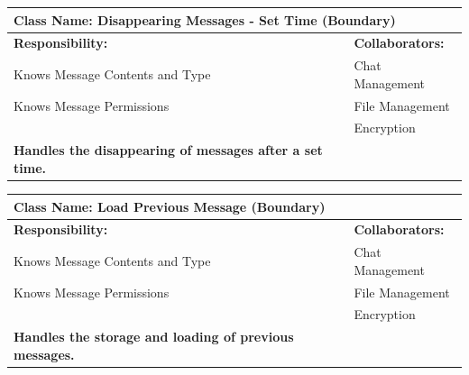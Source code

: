 \documentclass[]{article}
\begin{document}
\begin{itemize}
\begin{table}[ht]
\begin{tabular}{|p{7cm}|p{7cm}|}
		\vspace{1in} & \\
		\hline
  
		\end{tabular}
	\end{table}

	\begin{table}[ht]
		\centering
		\begin{tabular}{|p{7cm}|p{7cm}|}
		\hline 
		 \multicolumn{2}{|l|}{\textbf{Class Name:} Disappearing Messages - Set Time (Boundary)} \\
		\hline
		\textbf{Responsibility:} & \textbf{Collaborators:} \\
		\hline
            Knows Message Contents and Type & Chat Management\\
            Knows Message Permissions & File Management\\
            & Encryption\\
            
            \vspace{0.1in}
            \textbf{Handles the disappearing of messages after a set time.}

		\vspace{1in} & \\
		\hline
  
		\end{tabular}
	\end{table}


	\begin{table}[ht]
		\centering
		\begin{tabular}{|p{7cm}|p{7cm}|}
		\hline 
		 \multicolumn{2}{|l|}{\textbf{Class Name:} Load Previous Message (Boundary)} \\
		\hline
		\textbf{Responsibility:} & \textbf{Collaborators:} \\
		\hline
            Knows Message Contents and Type & Chat Management\\
            Knows Message Permissions & File Management\\
            & Encryption\\
            
            \vspace{0.1in}
            \textbf{Handles the storage and loading of previous messages.}

		\vspace{1in} & \\
		\hline
  

\end{tabular}
\end{table}
\end{itemize}
\end{document}
